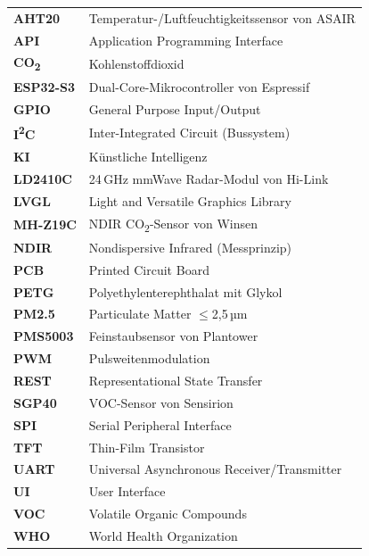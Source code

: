 \documentclass[12pt,a4paper,ngerman]{scrbook}
\begin{document}
\begin{tabular}{ll}
\textbf{AHT20} & Temperatur-/Luftfeuchtigkeitssensor von ASAIR \\
\textbf{API} & Application Programming Interface \\
\textbf{CO\textsubscript{2}} & Kohlenstoffdioxid \\
\textbf{ESP32-S3} & Dual-Core-Mikrocontroller von Espressif \\
\textbf{GPIO} & General Purpose Input/Output \\
\textbf{I\textsuperscript{2}C} & Inter-Integrated Circuit (Bussystem) \\
\textbf{KI} & Künstliche Intelligenz \\
\textbf{LD2410C} & 24\,GHz mmWave Radar-Modul von Hi-Link \\
\textbf{LVGL} & Light and Versatile Graphics Library \\
\textbf{MH-Z19C} & NDIR CO\textsubscript{2}-Sensor von Winsen \\
\textbf{NDIR} & Nondispersive Infrared (Messprinzip) \\
\textbf{PCB} & Printed Circuit Board \\
\textbf{PETG} & Polyethylenterephthalat mit Glykol \\
\textbf{PM2.5} & Particulate Matter $\leq$2,5\,µm \\
\textbf{PMS5003} & Feinstaubsensor von Plantower \\
\textbf{PWM} & Pulsweitenmodulation \\
\textbf{REST} & Representational State Transfer \\
\textbf{SGP40} & VOC-Sensor von Sensirion \\
\textbf{SPI} & Serial Peripheral Interface \\
\textbf{TFT} & Thin-Film Transistor \\
\textbf{UART} & Universal Asynchronous Receiver/Transmitter \\
\textbf{UI} & User Interface \\
\textbf{VOC} & Volatile Organic Compounds \\
\textbf{WHO} & World Health Organization \\
\end{tabular}

\listoffigures
{}

\listoftables
{}

\appendix

\end{document}
